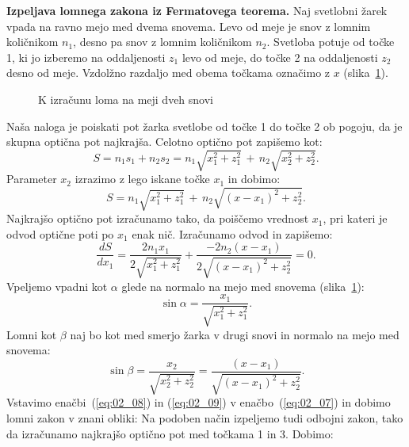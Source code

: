 \begin{example}
{\bf Izpeljava lomnega zakona iz Fermatovega teorema.}
Naj svetlobni žarek vpada na ravno mejo med dvema snovema. Levo od meje je snov 
z lomnim količnikom $n_1$, desno pa snov z lomnim količnikom $n_2$. Svetloba 
potuje od točke 1, ki jo izberemo na oddaljenosti $z_1$ levo 
od meje, do točke 2 na oddaljenosti $z_2$ desno od meje. Vzdolžno razdaljo med obema
točkama označimo z $x$ (slika~\ref{fig:02_FerLom}). 
\begin{figure}[ht]
\centering
\def\svgwidth{100truemm} 

\caption{K izračunu loma na meji dveh snovi}
\label{fig:02_FerLom}
\end{figure}

Naša naloga je poiskati pot žarka svetlobe od točke 1 do točke 2 ob pogoju, 
da je skupna optična pot najkrajša.
Celotno optično pot zapišemo kot:
\begin{equation}
S = n_1 s_1 + n_2 s_2 = n_1 \sqrt{x_1^2+z_1^2}\, +\, n_2 \sqrt{x_2^2+z_2^2}.
\label{eq:02_05}
\end{equation}
Parameter $x_2$ izrazimo z lego iskane točke $x_1$ in dobimo: 
\begin{equation}
S = n_1 \sqrt{x_1^2+z_1^2}\, +\, n_2 \sqrt{(x-x_1)^2+z_2^2}.
\label{eq:02_06}
\end{equation}
Najkrajšo optično pot izračunamo tako, da poiščemo vrednost $x_1$, 
pri kateri je odvod optične poti po $x_1$ enak nič. Izračunamo odvod in zapišemo:
\begin{equation}
\frac{dS}{dx_1} = \frac{2 n_1 x_1}{2 \sqrt{x_1^2+z_1^2}}+
\frac{-2n_2 (x-x_1)}{2 \sqrt{(x-x_1)^2+z_2^2}} = 0.
\label{eq:02_07}
\end{equation}
Vpeljemo vpadni kot $\alpha$ glede na normalo na mejo med snovema (slika~\ref{fig:02_FerLom}):
\begin{equation}
\sin \alpha = \frac{x_1}{\sqrt{x_1^2+z_1^2}}.
\label{eq:02_08}
\end{equation}
Lomni kot $\beta$ naj bo kot med smerjo žarka v drugi snovi in normalo na mejo med snovema: 
\begin{equation}
\sin \beta = \frac{x_2}{\sqrt{x_2^2+z_2^2}} = \frac{(x-x_1)}{\sqrt{(x-x_1)^2+z_2^2}}.
\label{eq:02_09}
\end{equation}
Vstavimo enačbi~(\ref{eq:02_08}) in (\ref{eq:02_09}) v enačbo~(\ref{eq:02_07})
in dobimo lomni zakon v znani obliki:
Na podoben način izpeljemo tudi odbojni zakon, tako da izračunamo 
najkrajšo optično pot med točkama 1 in 3. Dobimo:
\end{example}

